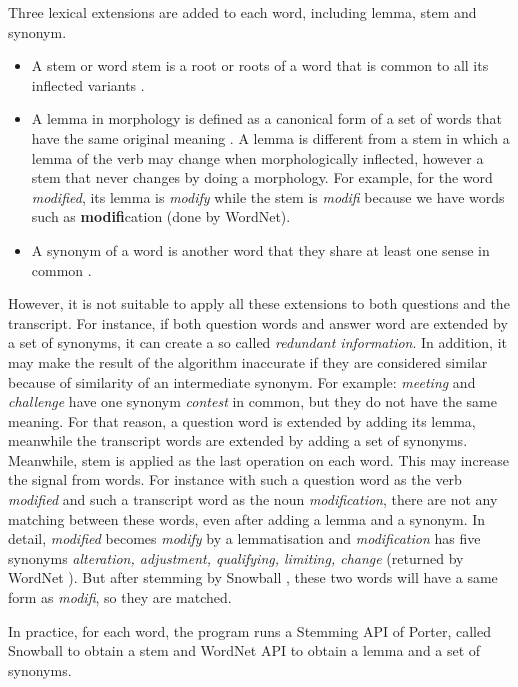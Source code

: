 Three lexical extensions are added to each word, including lemma, stem and synonym. 
\begin{itemize}
\item {A stem or word stem is a root or roots of a word that is common to all its inflected variants \cite{Stem}.}
\item {A lemma in morphology is defined as a canonical form of a set of words that have the same original meaning \cite{clement2004mba}. A lemma is different from a stem in which a lemma of the verb may change when morphologically inflected, however a stem that never changes by doing a morphology. For example, for the word \textit{modified}, its lemma is \textit{modify} while the stem is \textit{modifi} because we have words such as \textbf{modifi}cation (done by WordNet\cite{miller1995wld}).}
\item {A synonym of a word is another word that they share at least one sense in common \cite{miller1995wld}.}
\end{itemize}

However, it is not suitable to apply all these extensions to both questions and the transcript. For instance, if both question words and answer word are extended by a set of synonyms, it can create a so called \textit{redundant information}. In addition, it may make the result of the algorithm inaccurate if they are considered similar because of similarity of an intermediate synonym. For example: \textit{meeting} and \textit{challenge} have one synonym \textit{contest} in common, but they do not have the same meaning. For that reason, a question word is extended by adding its lemma, meanwhile the transcript words are extended by adding a set of synonyms. Meanwhile, stem is applied as the last operation on each word. This may increase the signal from words. For instance with such a question word as the verb \textit{modified} and such a transcript word as the noun \textit{modification}, there are not any matching between these words, even after adding a lemma and a synonym.  In detail, \textit{modified} becomes \textit{modify} by a lemmatisation and \textit{modification} has five synonyms \textit{alteration, adjustment, qualifying, limiting, change} (returned by WordNet \cite{pasca2001irw}). But after stemming by Snowball \cite{porter2001ss}, these two words will have a same form as \textit{modifi}, so they are matched.

In practice, for each word, the program runs a Stemming API of Porter, called Snowball \cite{porter2001ss} to obtain a stem and WordNet API \cite{pasca2001irw} to obtain a lemma and a set of synonyms.


